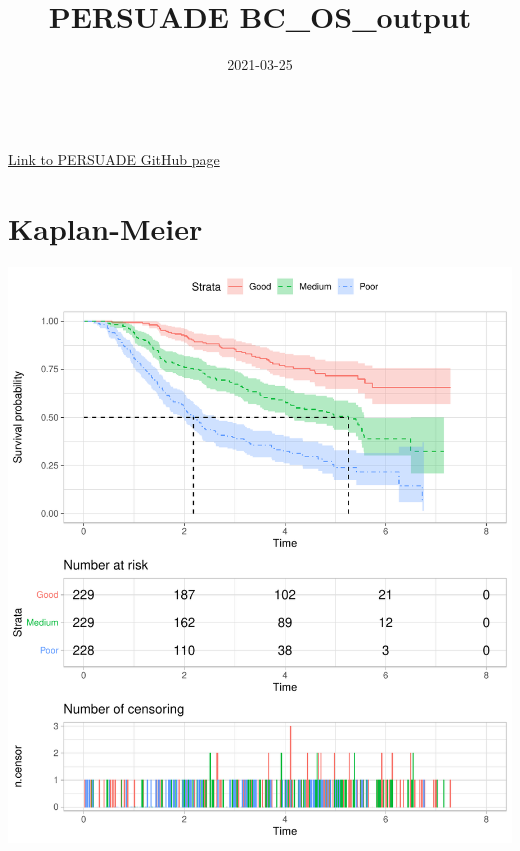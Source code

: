 \documentclass[]{article}
\title{PERSUADE BC\_OS\_output}
\author{}
\date{\vspace{-2.5em}2021-03-25}
\begin{document}
\maketitle

{
\hypersetup{linkcolor=black}
\setcounter{tocdepth}{2}
\tableofcontents
}
~\\
\href{https://github.com/Bram-R/PERSUADE}{Link to PERSUADE GitHub page}
\newpage

\section{Kaplan-Meier}\label{kaplan-meier}

\begin{flushleft}\includegraphics{Images/plot_KM-1} \end{flushleft}
\end{document}
